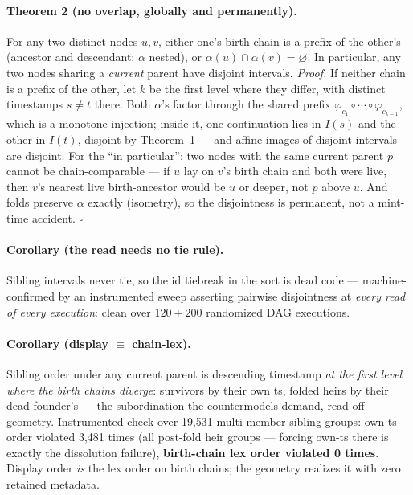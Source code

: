 \documentclass[11pt]{article}
\begin{document}
\paragraph{Theorem 2 (no overlap, globally and permanently).} For any
two distinct nodes $u, v$, either one's birth chain is a prefix of the
other's (ancestor and descendant: $\alpha$ nested), or
$\alpha(u) \cap \alpha(v) = \varnothing$. In particular, any two nodes
sharing a \emph{current} parent have disjoint intervals.
\emph{Proof.} If neither chain is a prefix of the other, let $k$ be the
first level where they differ, with distinct timestamps $s \ne t$
there. Both $\alpha$'s factor through the shared prefix
$\varphi_{c_1} \circ \cdots \circ \varphi_{c_{k-1}}$, which is a
monotone injection; inside it, one continuation lies in $I(s)$ and the
other in $I(t)$, disjoint by Theorem~1 --- and affine images of
disjoint intervals are disjoint. For the ``in particular'': two nodes
with the same current parent $p$ cannot be chain-comparable --- if $u$
lay on $v$'s birth chain and both were live, then $v$'s nearest live
birth-ancestor would be $u$ or deeper, not $p$ above $u$. And folds
preserve $\alpha$ exactly (isometry), so the disjointness is permanent,
not a mint-time accident. $\square$

\paragraph{Corollary (the read needs no tie rule).} Sibling intervals
never tie, so the id tiebreak in the sort is dead code ---
machine-confirmed by an instrumented sweep asserting pairwise
disjointness at \emph{every read of every execution}: clean over
$120 + 200$ randomized DAG executions.

\paragraph{Corollary (display $\equiv$ chain-lex).} Sibling order under
any current parent is descending timestamp \emph{at the first level
where the birth chains diverge}: survivors by their own ts, folded
heirs by their dead founder's --- the subordination the countermodels
demand, read off geometry. Instrumented check over 19{,}531
multi-member sibling groups: own-ts order violated 3{,}481 times (all
post-fold heir groups --- forcing own-ts there is exactly the
dissolution failure), \textbf{birth-chain lex order violated 0 times}.
Display order \emph{is} the lex order on birth chains; the geometry
realizes it with zero retained metadata.
\end{document}
